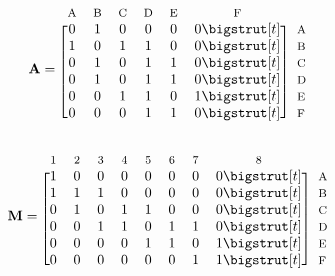  \begin{equation*}
  \mathbf{A}=
  \begin{blockarray}{*{6}{c} l}
    \begin{block}{*{6}{>{$\footnotesize}c<{$}} l}
      A & B & C & D & E & F \\
    \end{block}
    \begin{block}{[*{6}{c}]>{$\footnotesize}l<{$}}
      0 & 1 & 0 & 0 & 0 & 0 \bigstrut[t]& A \\
      1 & 0 & 1 & 1 & 0 & 0 \bigstrut[t]&B \\
      0 & 1 & 0 & 1 & 1 & 0 \bigstrut[t]&C \\
      0 & 1 & 0 & 1 & 1 & 0 \bigstrut[t]& D \\
      0 & 0 & 1 & 1 & 0 & 1 \bigstrut[t]& E \\
      0 & 0 & 0 & 1 & 1 & 0 \bigstrut[t]& F \\
    \end{block}
  \end{blockarray}
\end{equation*}


 \begin{equation*}
  \mathbf{M}=
  \begin{blockarray}{*{8}{c} l}
    \begin{block}{*{8}{>{$\footnotesize}c<{$}} l}
      1 & 2 & 3 & 4 & 5 & 6 & 7 & 8 \\
    \end{block}
    \begin{block}{[*{8}{c}]>{$\footnotesize}l<{$}}
      1 & 0 & 0 & 0 & 0 & 0 & 0 & 0 \bigstrut[t]& A \\
      1 & 1 & 1 & 0 & 0 & 0 & 0 & 0 \bigstrut[t]&B \\
      0 & 1 & 0 & 1 & 1 & 0 & 0 & 0 \bigstrut[t]&C \\
     0 & 0 & 1 & 1 & 0 & 1 & 1 & 0 \bigstrut[t]& D \\
      0 & 0 & 0 & 0 & 1 & 1 & 0 & 1 \bigstrut[t]& E \\
     0 & 0 & 0 & 0 & 0 & 0 & 1 & 1 \bigstrut[t]& F \\
    \end{block}
  \end{blockarray}
\end{equation*}


